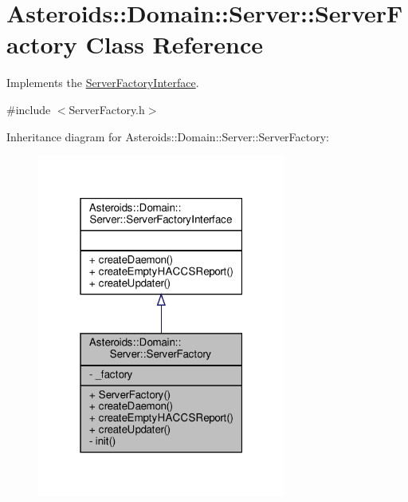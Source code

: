 \hypertarget{classAsteroids_1_1Domain_1_1Server_1_1ServerFactory}{}\section{Asteroids\+:\+:Domain\+:\+:Server\+:\+:Server\+Factory Class Reference}
\label{classAsteroids_1_1Domain_1_1Server_1_1ServerFactory}


Implements the \hyperlink{classAsteroids_1_1Domain_1_1Server_1_1ServerFactoryInterface}{Server\+Factory\+Interface}.  




{\ttfamily \#include $<$Server\+Factory.\+h$>$}



Inheritance diagram for Asteroids\+:\+:Domain\+:\+:Server\+:\+:Server\+Factory\+:\nopagebreak
\begin{figure}[H]
\begin{center}
\leavevmode
\includegraphics[width=232pt]{classAsteroids_1_1Domain_1_1Server_1_1ServerFactory__inherit__graph}
\end{center}
\end{figure}


